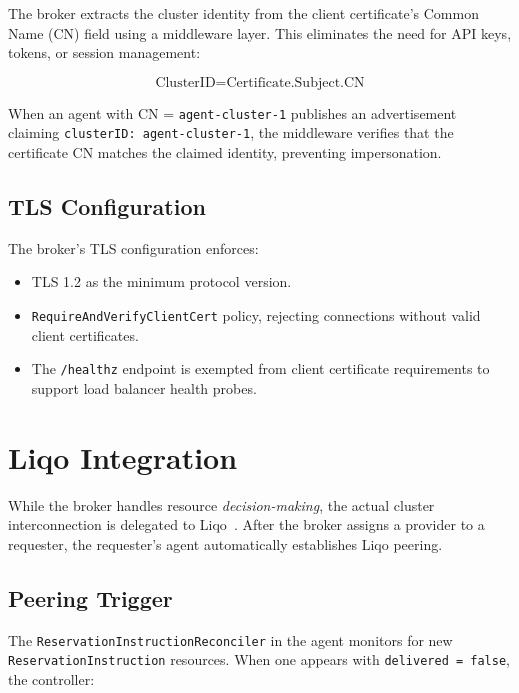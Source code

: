 The broker extracts the cluster identity from the client certificate's Common Name (CN) field using a middleware layer. This eliminates the need for API keys, tokens, or session management:

\begin{equation*}
    \text{ClusterID} = \text{Certificate.Subject.CN}
\end{equation*}

When an agent with CN = \texttt{agent-cluster-1} publishes an advertisement claiming \texttt{clusterID: agent-cluster-1}, the middleware verifies that the certificate CN matches the claimed identity, preventing impersonation.

\subsection{TLS Configuration}

The broker's TLS configuration enforces:
\begin{itemize}
    \item TLS 1.2 as the minimum protocol version.
    \item \texttt{RequireAndVerifyClientCert} policy, rejecting connections without valid client certificates.
    \item The \texttt{/healthz} endpoint is exempted from client certificate requirements to support load balancer health probes.
\end{itemize}


\section{Liqo Integration}
\label{sec:liqo-integration}

While the broker handles resource \emph{decision-making}, the actual cluster interconnection is delegated to Liqo~\cite{liqo}. After the broker assigns a provider to a requester, the requester's agent automatically establishes Liqo peering.

\subsection{Peering Trigger}

The \texttt{ReservationInstructionReconciler} in the agent monitors for new \texttt{ReservationInstruction} resources. When one appears with \texttt{delivered = false}, the controller:

